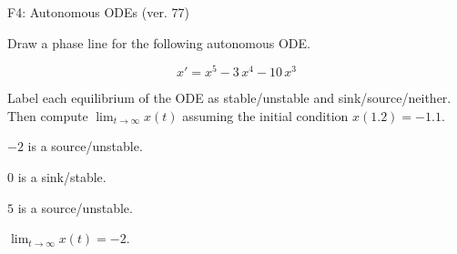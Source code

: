 \begin{exercise}
  \begin{exerciseTitle}F4: Autonomous ODEs (ver. 77)\end{exerciseTitle}
  \begin{exerciseStatement}
    

      Draw a phase line for the following 
      autonomous ODE.
    

    
\[x'= x^{5} - 3 \, x^{4} - 10 \, x^{3}\]

    

      Label each equilibrium of the ODE
      as stable/unstable and sink/source/neither.
      Then compute \(\lim_{t\to\infty}x(t)\)
      assuming the initial condition
      \(x( 1.2 )= -1.1\).
    

  \end{exerciseStatement}
  \begin{exerciseAnswer}
    

      \(-2\) is a source/unstable.
      
        \(0\) is a sink/stable.
      
      \(5\) is a source/unstable.
    

    

      \(\lim_{t\to\infty}x(t)=-2\).
    

  \end{exerciseAnswer}
\end{exercise}